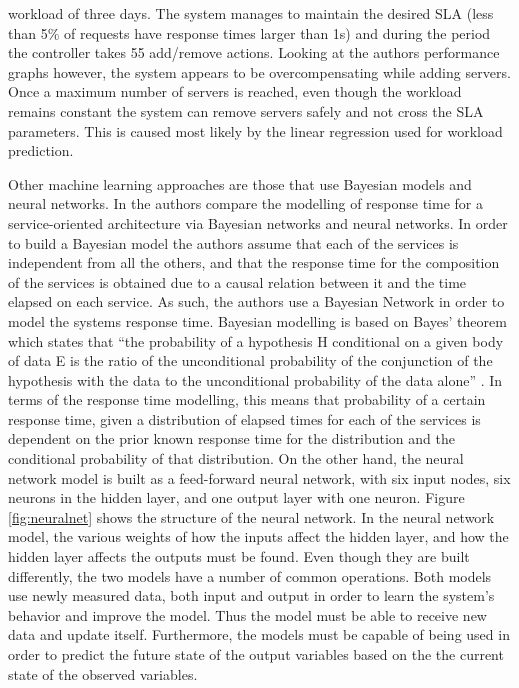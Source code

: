workload of three days. The system manages to maintain the desired SLA (less than 5\% of requests have response times larger than 1s) and during the period the controller takes 55 add/remove actions. Looking at the authors performance graphs however, the system appears to be overcompensating while adding servers. Once a maximum number of servers is reached, even though the workload remains constant the system can remove servers safely and not cross the SLA parameters. This is caused most likely by the linear regression used for workload prediction.

Other machine learning approaches are those that use Bayesian models and neural networks. In \cite{related:model:ml} the authors compare the modelling of response time for a service-oriented architecture via Bayesian networks and neural networks. In order to build a Bayesian model the authors assume that each of the services is independent from all the others, and that the response time for the composition of the services is obtained due to a causal relation between it and the time elapsed on each service. As such, the authors use a Bayesian Network in order to model the systems response time.  Bayesian modelling is based on Bayes' theorem which states that ``the probability of a hypothesis H conditional on a given body of data E is the ratio of the unconditional probability of the conjunction of the hypothesis with the data to the unconditional probability of the data alone'' \cite{standford:bayes}. In terms of the response time modelling, this means that probability of a certain response time, given a distribution of elapsed times for each of the services is dependent on the prior known response time for the distribution and the conditional probability of that distribution. On the other hand, the neural network model is built as a feed-forward neural network, with six input nodes, six neurons in the hidden layer, and one output layer with one neuron. Figure \ref{fig:neuralnet} shows the structure of the neural network. In the neural network model, the various weights of how the inputs affect the hidden layer, and how the hidden layer affects the outputs must be found. Even though they are built differently, the two models have a number of common operations. Both models use newly measured data, both input and output in order to learn the system's behavior and improve the model. Thus the model must be able to receive new data and update itself. Furthermore, the models must be capable of being used in order to predict the future state of the output variables based on the the current state of the observed variables.

